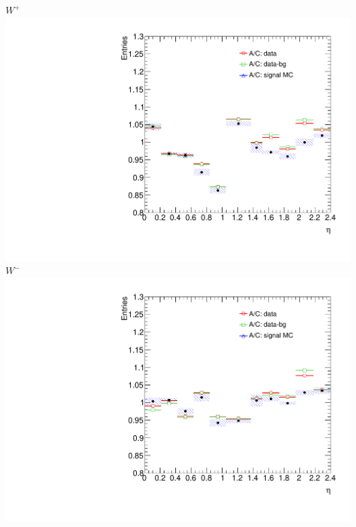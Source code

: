 {
\colb[T]
\centering
\small{ $W^{+}$}
\includegraphics[width=1.0\textwidth]{dates/20130403/figures/old/ACSIDE/W_NOM_Q0_stack_d3_eta_lpt_met_y_2__1_z_0__1_POS}
\centering
\small{ $W^{-}$}
\includegraphics[width=1.0\textwidth]{dates/20130403/figures/old/ACSIDE/W_NOM_Q0_stack_d3_eta_lpt_met_y_2__1_z_0__1_NEG}
\cole
}

